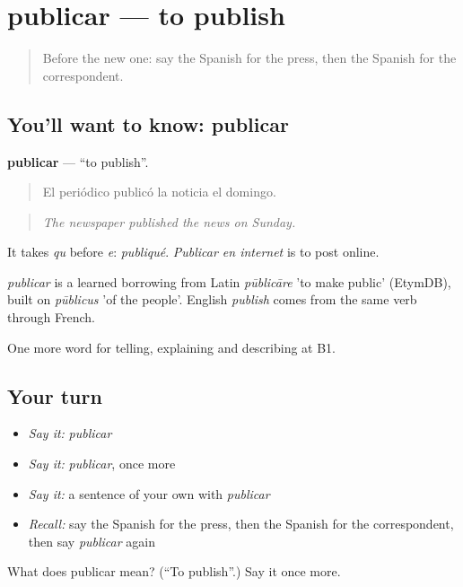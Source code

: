 \section[publicar]{publicar — to publish}

\label{lesson:ES-C513-publicar}



\begin{quote}
Before the new one: say the Spanish for the press, then the Spanish for the correspondent.
\end{quote}

\subsection*{You'll want to know: publicar}
\textbf{publicar} — \textquotedblleft{}to publish\textquotedblright{}.

\begin{quote}
El periódico publicó la noticia el domingo.
\end{quote}

\begin{quote}
\emph{The newspaper published the news on Sunday.}
\end{quote}

It takes \emph{qu} before \emph{e}: \emph{publiqué}. \emph{Publicar en internet} is to post online.

\begin{cousinweb}
\emph{publicar} is a learned borrowing from Latin \emph{pūblicāre} 'to make public' (EtymDB), built on \emph{pūblicus} 'of the people'. English \emph{publish} comes from the same verb through French.
\end{cousinweb}

\begin{grammarlens}[title={What you've built}]
One more word for telling, explaining and describing at B1.
\end{grammarlens}

\subsection*{Your turn}
\begin{itemize}
\raggedright
  \item \emph{Say it:} \emph{publicar}
  \item \emph{Say it:} \emph{publicar}, once more
  \item \emph{Say it:} a sentence of your own with \emph{publicar}
  \item \emph{Recall:} say the Spanish for the press, then the Spanish for the correspondent, then say \emph{publicar} again
\end{itemize}

\begin{tcolorbox}[breakable,colback=teal!4,colframe=teal!35!black,title={Before you move on}]
What does publicar mean? (\textquotedblleft{}To publish\textquotedblright{}.) Say it once more.
\end{tcolorbox}
